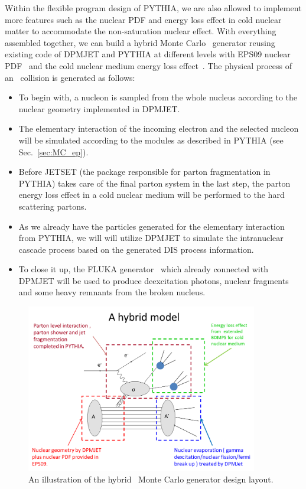 Within the flexible program design of PYTHIA, we are also allowed to implement
more features such as the nuclear PDF and energy loss effect in cold nuclear
matter to accommodate the non-saturation nuclear effect. 
With everything assembled together, we can build a hybrid Monte Carlo \eA\ generator reusing existing
code of DPMJET and PYTHIA at different levels with EPS09 nuclear PDF~\cite{Eskola:2009uj}
and the cold nuclear medium energy loss effect~\cite{Salgado:2003gb}. The physical process of an \eA\ collision is
generated as follows:

\begin{itemize}
    \item To begin with, a nucleon is sampled from the whole nucleus according to the nuclear geometry implemented in DPMJET.
    \item The elementary interaction of the incoming electron and the selected nucleon will be simulated according to the modules as described in PYTHIA (see Sec.~\ref{sec:MC_ep}).
    \item Before JETSET (the package responsible for parton fragmentation in PYTHIA) takes care of the final parton system in the last step, the parton energy loss effect in a cold nuclear medium will be performed to the hard scattering partons. 
    \item As we already have the particles generated for the elementary interaction from PYTHIA, we will will utilize DPMJET to simulate the intranuclear cascade process based on the generated DIS process information.
    \item To close it up, the FLUKA generator~\cite{Ferrari:1995cq} which already connected with DPMJET will be used to produce deexcitation photons, nuclear fragments and some heavy remnants from the broken nucleus.
\end{itemize}

\begin{figure}
\centering
\includegraphics[width=0.9\textwidth]{plots/chpt5/eA_hybrid_layout.png} 
\caption[An illustration of the hybrid \eA\ Monte Carlo generator design layout] {
An illustration of the hybrid \eA\ Monte Carlo generator design layout. }
\label{fig:MC_hybrid_chart}
\end{figure}

